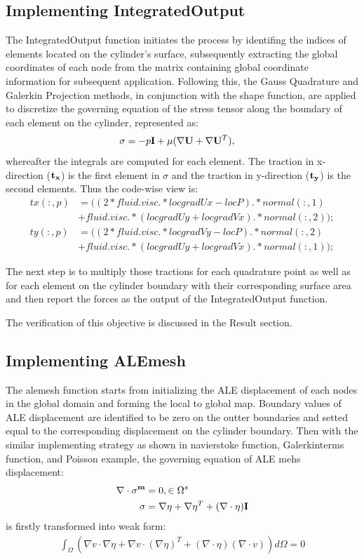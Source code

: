\documentclass[a4paper,12pt]{article} %
\begin{document}
\subsection*{Implementing IntegratedOutput}
The IntegratedOutput function initiates the process by identifing the indices of elements located on the cylinder's 
surface, subsequently extracting the global coordinates of each node from the matrix containing global coordinate 
information for subsequent application. Following this, the Gauss Quadrature and Galerkin Projection methods, 
in conjunction with the shape function, are applied to discretize the governing equation of the stress tensor 
along the boundary of each element on the cylinder, represented as:
\begin{align*}
    \mathbf{\sigma} &= -p\mathbf{I} + \mu(\nabla \mathbf{U} + \nabla \mathbf{U}^T),
\end{align*}
whereafter the integrals are computed for each element. The traction in x-direction ($\mathbf{t_x}$) is the first 
element in $\sigma$ and the traction in y-direction ($\mathbf{t_y}$) is the second elements. Thus the code-wise view is:
\begin{align*}
    tx(:,p) &= ((2*fluid.visc.*locgradUx-locP).*normal(:,1)\\
    & + fluid.visc.*(locgradUy+locgradVx).*normal(:,2));\\
    ty(:,p) &= ((2*fluid.visc.*locgradVy-locP).*normal(:,2)\\
    & + fluid.visc.*(locgradUy+locgradVx).*normal(:,1));
\end{align*}

The next step is to multiply those tractions for each quadrature point as well as for each element on the cylinder 
boundary with their corresponding surface area and then report the forces as the output of the IntegratedOutput function.

The verification of this objective is discussed in the Result section.

\subsection*{Implementing ALEmesh}
The alemesh function starts from initializing the ALE displacement of each nodes in the global domain and forming
the local to global map. Boundary values of ALE displacement are identified to be zero on the outter boundaries and
setted equal to the corresponding displacement on the cylinder boundary.
Then with the similar implementing strategy as shown in navierstoke function, Galerkinterms function, and Poisson 
example, the governing equation of ALE mehs displacement:
\begin{align*}
    \nabla \cdot \mathbf{\sigma^m} &= 0,    \in \Omega^s \\                                      
    \mathbf{\sigma} &= \nabla \mathbf{\eta} + \nabla \mathbf{\eta}^T + (\nabla \cdot \mathbf{\eta})\mathbf{I}
\end{align*}
is firstly transformed into weak form:
\begin{align*}
    \int_{\Omega} \left( \nabla v \cdot \nabla \eta + \nabla v \cdot (\nabla \eta)^T + (\nabla \cdot \eta)(\nabla \cdot v) \right) d\Omega = 0
\end{align*}
\end{document}
